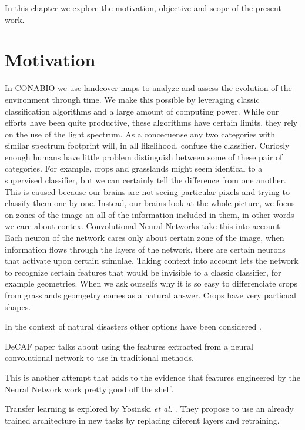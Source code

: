 In this chapter we explore the motivation, objective and scope of the present work. 


\section{Motivation}

In CONABIO we use landcover maps to analyze and assess the evolution of the environment through time. We make this possible by leveraging classic classification algorithms and a large amount of computing power. While our efforts have been quite productive, these algorithms have certain limits, they rely on the use of the light spectrum. As a concecuense any two categories with similar spectrum footprint will, in all likelihood, confuse the classifier. Curiosly enough humans have little problem distinguish between some of these pair of categories. For example, crops and grasslands might seem identical to a supervised classifier, but we can certainly tell the difference from one another. This is caused because our brains are not seeing particular pixels and trying to classify them one by one. Instead, our brains look at the whole picture, we focus on zones of the image an all of the information included in them, in other words we care about contex. Convolutional Neural Networks take this into account. Each neuron of the network cares only about certain zone of the image, when information flows through the layers of the network, there are certain neurons that activate upon certain stimulae. Taking context into account lets the network to recognize certain features that would be invisible to a classic classifier, for example geometries. When we ask ourselfs why it is so easy to differenciate crops from grasslands geomgetry comes as a natural answer. Crops have very particual shapes.

In the context of natural disasters other options have been considered \cite{Kryvasheyeue1500779}.

DeCAF paper talks about using the features extracted from a neural convolutional network to use in traditional methods. \cite{DBLP:journals/corr/DonahueJVHZTD13}

This is another attempt that adds to the evidence that features engineered by the Neural Network work pretty good off the shelf. \cite{DBLP:journals/corr/RazavianASC14}

Transfer learning is explored by Yosinski \textit{et al.} \cite{DBLP:journals/corr/YosinskiCBL14}. They propose to use an already trained architecture in new tasks by replacing diferent layers and retraining.

